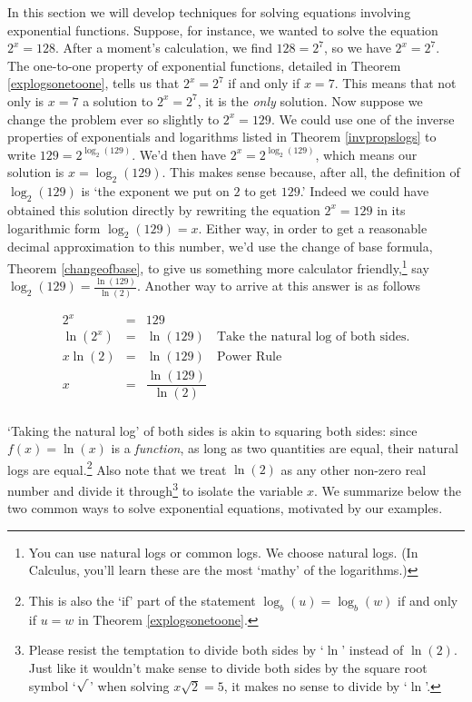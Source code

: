 

\setcounter{footnote}{0}

\label{ExpEquations}

In this section we will develop techniques for solving equations involving exponential functions.  Suppose, for instance,  we wanted to solve the equation $2^{x} = 128$.  After a moment's calculation, we find $128 = 2^{7}$, so we have $2^{x} = 2^{7}$.  The one-to-one property of exponential functions, detailed in Theorem \ref{explogsonetoone}, tells us that $2^{x} = 2^{7}$ if and only if $x=7$.  This means that not only is $x=7$ a solution to $2^{x} = 2^{7}$, it is the \textit{only} solution.  Now suppose we change the problem ever so slightly to $2^{x} = 129$.  We could use one of the inverse properties of exponentials and logarithms listed in Theorem \ref{invpropslogs} to write $129 = 2^{\log_{2}(129)}$.  We'd then have $2^{x} = 2^{\log_{2}(129)}$, which means our solution is $x = \log_{2}(129)$. This makes sense because, after all, the definition of $\log_{2}(129)$ is `the exponent we put on $2$ to get $129$.' Indeed we could have obtained this solution directly by rewriting the equation $2^{x} = 129$ in its logarithmic form $\log_{2}(129) = x$.  Either way, in order to get a reasonable decimal approximation to this number, we'd use the change of base formula, Theorem \ref{changeofbase}, to give us something more calculator friendly,\footnote{You can use natural logs or common logs.  We choose natural logs.  (In Calculus, you'll learn these are the most `mathy' of the logarithms.)} say $\log_{2}(129) = \frac{\ln(129)}{\ln(2)}$.  Another way to arrive at this answer is as follows


\[ \begin{array}{rclr}
2^{x} & = & 129 & \\
\ln\left(2^{x}\right) & = & \ln(129) & \mbox{Take the natural log of both sides.} \\
x \ln(2) & = & \ln(129) & \mbox{Power Rule} \\ [4pt]
x & = &\dfrac{\ln(129)}{\ln(2)} & \\
\end{array}\]

`Taking the natural log' of both sides is akin to squaring both sides: since $f(x) = \ln(x)$ is a \textit{function}, as long as two quantities are equal, their natural logs are equal.\footnote{This is also the `if' part of the statement $\log_{b}(u) = \log_{b}(w)$ if and only if $u=w$ in Theorem \ref{explogsonetoone}.} Also note that we treat $\ln(2)$ as any other non-zero real number and divide it through\footnote{Please resist the temptation to divide both sides by `$\ln$' instead of $\ln(2)$.   Just like it wouldn't make sense to divide both sides by the square root symbol `$\sqrt{\vphantom{2} \,}$' when solving $x \sqrt{2} = 5$, it makes no sense to divide by `$\ln$'.}  to isolate the variable $x$.  We summarize below the two common ways to solve exponential equations, motivated by our examples.

